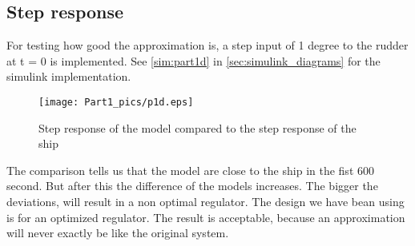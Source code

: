 \subsection{Step response}
For testing how good the approximation is, a step input of 1 degree to the rudder at t = 0 is implemented. See \cref{sim:part1d} in \cref{sec:simulink_diagrams} for the simulink implementation.
\begin{figure}[H]
    \centering
    \texttt{[image: Part1\_pics/p1d.eps]}
    \caption{Step response of the model compared to the step response of the ship }
    \label{fig:p1d}
\end{figure}
The comparison tells us that the model are close to the ship in the fist 600 second. But after this the difference of the models increases. The bigger the deviations, will result in a non optimal regulator. The design we have bean using is for an optimized regulator. 
\bigskip
The result is acceptable, because an approximation will never exactly be like the original system. 



